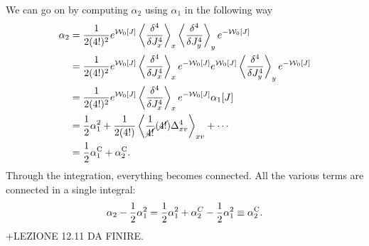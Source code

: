 We can go on by computing $\alpha_2$ using $\alpha_1$ in the following way 
\begin{equation}
    \begin{split}
        \alpha_2 &= \frac{1}{2(4!)^2}e^{\mathcal{W}_0[J]}\left\langle \frac{\delta^4}{\delta J_x^4} \right\rangle_x\left\langle \frac{\delta^4}{\delta J_y^4} \right\rangle_y e^{-\mathcal{W}_0[J]} \\
        &= \frac{1}{2(4!)^2}e^{\mathcal{W}_0[J]}\left\langle \frac{\delta^4}{\delta J_x^4} \right\rangle_x e^{-\mathcal{W}_0[J]}e^{\mathcal{W}_0[J]}\left\langle \frac{\delta^4}{\delta J_y^4} \right\rangle_y e^{-\mathcal{W}_0[J]} \\
        &=  \frac{1}{2(4!)^2}e^{\mathcal{W}_0[J]}\left\langle \frac{\delta^4}{\delta J_x^4} \right\rangle_x e^{-\mathcal{W}_0[J]}\alpha_1[J] \\
        &= \frac{1}{2}\alpha_1^2 + \frac{1}{2(4!)}\left\langle \frac{1}{\cancel{4!}}(\cancel{4!})\Delta_{xv}^4 \right\rangle_{xv} + \cdots \\
        &= \frac{1}{2}\alpha_1^{\mathrm{C}} + \alpha_2^{\mathrm{C}}.
    \end{split}
\end{equation}
Through the integration, everything becomes connected. All the various terms are connected in a single integral:
\begin{equation}
    \alpha_2 - \frac{1}{2}\alpha_1^2 = \frac{1}{2}\alpha_1^2 + \alpha_2^C - \frac{1}{2}\alpha_1^2 \equiv \alpha_2^{\mathrm{C}}.
\end{equation}
+LEZIONE 12.11 DA FINIRE.

